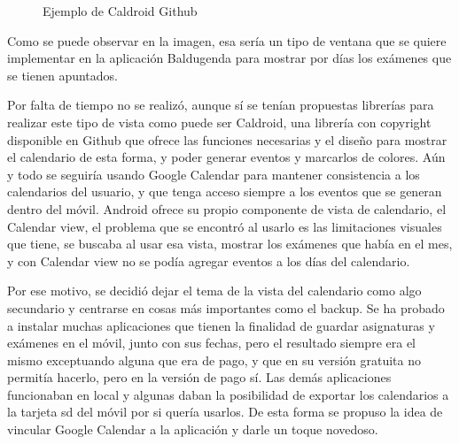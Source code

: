 \begin{figure}[H] 
  \begin{center} 
    \caption{Ejemplo de Caldroid Github} 
    \label{fig:Caldroid} 
  \end{center} 
\end{figure}

Como se puede observar en la imagen, esa sería un tipo de ventana que se quiere implementar en la aplicación Baldugenda para mostrar por días los exámenes que se tienen apuntados.

Por falta de tiempo no se realizó, aunque sí se tenían propuestas librerías para realizar este tipo de vista como puede ser Caldroid, una librería con copyright disponible en Github que ofrece las funciones necesarias y el diseño para mostrar el calendario de esta forma, y poder generar eventos y marcarlos de colores.
Aún y todo se seguiría usando Google Calendar para mantener consistencia a los calendarios del usuario, y que tenga acceso siempre a los eventos que se generan dentro del móvil.
Android ofrece su propio componente de vista de calendario, el Calendar view, el problema que se encontró al usarlo es las limitaciones visuales que tiene, se buscaba al usar esa vista, mostrar los exámenes que había en el mes, y con Calendar view no se podía agregar eventos a los días del calendario.

Por ese motivo, se decidió dejar el tema de la vista del calendario como algo secundario y centrarse en cosas más importantes como el backup.
Se ha probado a instalar muchas aplicaciones que tienen la finalidad de guardar asignaturas y exámenes en el móvil, junto con sus fechas, pero el resultado siempre era el mismo exceptuando alguna que era de pago, y que en su versión gratuita no permitía hacerlo, pero en la versión de pago sí. Las demás aplicaciones funcionaban en local y algunas daban la posibilidad de exportar los calendarios a la tarjeta sd del móvil por si quería usarlos.
De esta forma se propuso la idea de vincular Google Calendar a la aplicación y darle un toque novedoso.


